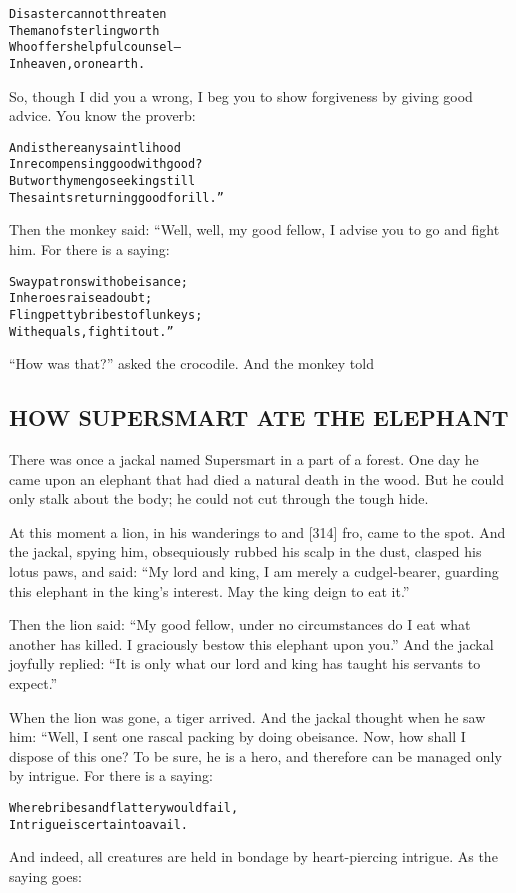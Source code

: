 \documentclass{article}
\renewenvironment{verbatim}{\begin{alltt}\normalfont\begin{centering}}{\end{centering}\end{alltt}}
\begin{document}
\begin{verbatim}
Disaster cannot threaten
    The man of sterling worth
Who offers helpful counsel--
    In heaven, or on earth.
\end{verbatim}
So, though I did you a wrong, I beg you to show forgiveness by
giving good advice. You know the proverb:

\begin{verbatim}
And is there any saintlihood
In recompensing good with good?
But worthy men go seeking still
The saints returning good for ill.”
\end{verbatim}
Then the monkey said: “Well, well, my good fellow, I advise you to
go and fight him. For there is a saying:

\begin{verbatim}
Sway patrons with obeisance;
    In heroes raise a doubt;
Fling petty bribes to flunkeys;
    With equals, fight it out.”
\end{verbatim}
``How was that?'' asked the crocodile. And the monkey told

\subsection{HOW SUPERSMART ATE THE ELEPHANT}

There was once a jackal named Supersmart in a part of a forest. One
day he came upon an elephant that had died a natural death in the
wood. But he could only stalk about the body; he could not cut
through the tough hide.

At this moment a lion, in his wanderings to and [314] fro, came to
the spot. And the jackal, spying him, obsequiously rubbed his scalp
in the dust, clasped his lotus paws, and said:
``My lord and king, I am merely a cudgel-bearer, guarding this elephant in the king's interest. May the king deign to eat it.''

Then the lion said:
``My good fellow, under no circumstances do I eat what another has killed. I graciously bestow this elephant upon you.''
And the jackal joyfully replied:
``It is only what our lord and king has taught his servants to expect.''

When the lion was gone, a tiger arrived. And the jackal thought
when he saw him: “Well, I sent one rascal packing by doing
obeisance. Now, how shall I dispose of this one? To be sure, he is
a hero, and therefore can be managed only by intrigue. For there is
a saying:

\begin{verbatim}
Where bribes and flattery would fail,
Intrigue is certain to avail.
\end{verbatim}
And indeed, all creatures are held in bondage by heart-piercing
intrigue. As the saying goes:
\end{document}
